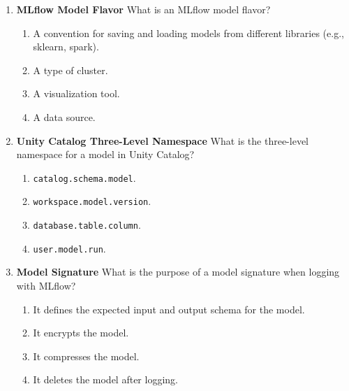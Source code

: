 \documentclass{article}
\begin{document}
\begin{enumerate}[label=\textbf{Q\arabic*.}]
		\item \textbf{MLflow Model Flavor}
		What is an MLflow model flavor?
		\begin{enumerate}[label=\Alph*.]
			\item A convention for saving and loading models from different libraries (e.g., sklearn, spark).
			\item A type of cluster.
			\item A visualization tool.
			\item A data source.
		\end{enumerate}
		
		\item \textbf{Unity Catalog Three-Level Namespace}
		What is the three-level namespace for a model in Unity Catalog?
		\begin{enumerate}[label=\Alph*.]
			\item \texttt{catalog.schema.model}.
			\item \texttt{workspace.model.version}.
			\item \texttt{database.table.column}.
			\item \texttt{user.model.run}.
		\end{enumerate}
		
		\item \textbf{Model Signature}
		What is the purpose of a model signature when logging with MLflow?
		\begin{enumerate}[label=\Alph*.]
			\item It defines the expected input and output schema for the model.
			\item It encrypts the model.
			\item It compresses the model.
			\item It deletes the model after logging.
		\end{enumerate}
		
	\end{enumerate}
	
\end{document}
